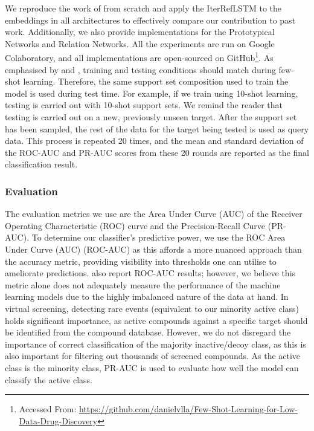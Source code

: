 We reproduce the work of \citet{altae2017low} from scratch and apply the IterRefLSTM to the embeddings in all architectures to effectively compare our contribution to past work. Additionally, we also provide implementations for the Prototypical Networks and Relation Networks. All the experiments are run on Google Colaboratory, and all implementations are open-sourced on GitHub\footnote{Accessed From: \url{https://github.com/danielvlla/Few-Shot-Learning-for-Low-Data-Drug-Discovery}}. As emphasised by \citet{vinyals2016matching} and \citet{snell2017prototypical}, training and testing conditions should match during few-shot learning. Therefore, the same support set composition used to train the model is used during test time. For example, if we train using 10-shot learning, testing is carried out with 10-shot support sets. We remind the reader that testing is carried out on a new, previously unseen target. After the support set has been sampled, the rest of the data for the target being tested is used as query data. This process is repeated 20 times, and the mean and standard deviation of the ROC-AUC and PR-AUC scores from these 20 rounds are reported as the final classification result.

\subsubsection{Evaluation}

The evaluation metrics we use are the Area Under Curve (AUC) of the Receiver Operating Characteristic (ROC) curve and the Precision-Recall Curve (PR-AUC). To determine our classifier's predictive power, we use the ROC Area Under Curve (AUC) (ROC-AUC) as this affords a more nuanced approach than the accuracy metric, providing visibility into thresholds one can utilise to ameliorate predictions. \citet{altae2017low} also report ROC-AUC results; however, we believe this metric alone does not adequately measure the performance of the machine learning models due to the highly imbalanced nature of the data at hand. In virtual screening, detecting rare events (equivalent to our minority active class) holds significant importance, as active compounds against a specific target should be identified from the compound database. However, we do not disregard the importance of correct classification of the majority inactive/decoy class, as this is also important for filtering out thousands of screened compounds. As the active class is the minority class, PR-AUC is used to evaluate how well the model can classify the active class.

